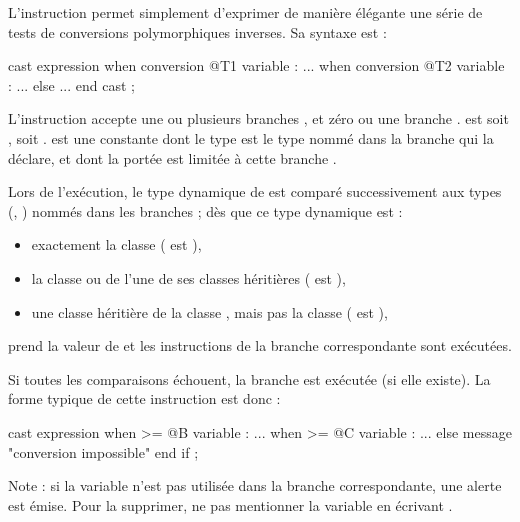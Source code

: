 




L'instruction  permet simplement d'exprimer de manière élégante une série de tests de conversions polymorphiques inverses. Sa syntaxe est :

\begin{galgascode}
cast expression
when conversion @T1 variable :
  ...
when conversion @T2 variable :
  ...
else
  ...
end cast ;
\end{galgascode}

L'instruction accepte une ou plusieurs branches , et zéro ou une branche .  est soit \galgas{==}, soit \galgas{>=}.  est une constante dont le type est le type nommé dans la branche  qui la déclare, et dont la portée est limitée à cette branche .

Lors de l'exécution, le type dynamique de  est comparé successivement aux types (, ) nommés dans les branches  ; dès que ce type dynamique est :
\begin{itemize}
  \item exactement la classe  ( est \galgas{==}), 
  \item la classe  ou de l'une de ses classes héritières ( est \galgas{>=}),
  \item une classe héritière de la classe , mais pas la classe  ( est \galgas{>}),
\end{itemize}
 prend la valeur de  et les instructions de la branche correspondante sont exécutées.

Si toutes les comparaisons échouent, la branche  est exécutée (si elle existe). La forme typique de cette instruction est donc :


\begin{galgascode}
cast expression
when >= @B variable :
  ...
when >= @C variable :
  ...
else
  message "conversion impossible"
end if ;
\end{galgascode}

Note : si la variable  n'est pas utilisée dans la branche correspondante, une alerte est émise. Pour la supprimer, ne pas mentionner la variable en écrivant .



